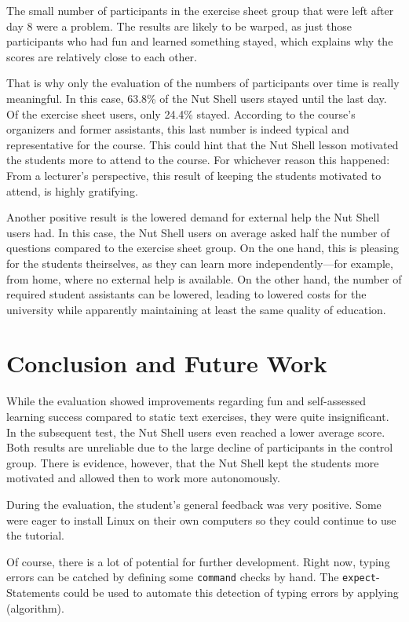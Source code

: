 \documentclass[paper=a4,twoside,abstract=on,cleardoublepage=empty,numbers=noenddot,toc=bib,12pt,appendixprefix=true]{scrreprt}
\begin{document}
The small number of participants in the exercise sheet group that were left after day 8 were a problem. The results are likely to be warped, as just those participants who had fun and learned something stayed, which explains why the scores are relatively close to each other.

That is why only the evaluation of the numbers of participants over time is really meaningful. In this case, 63.8\% of the Nut Shell users stayed until the last day. Of the exercise sheet users, only 24.4\% stayed. According to the course's organizers and former assistants, this last number is indeed typical and representative for the course. This could hint that the Nut Shell lesson motivated the students more to attend to the course. For whichever reason this happened: From a lecturer's perspective, this result of keeping the students motivated to attend, is highly gratifying.

Another positive result is the lowered demand for external help the Nut Shell users had. In this case, the Nut Shell users on average asked half the number of questions compared to the exercise sheet group. On the one hand, this is pleasing for the students theirselves, as they can learn more independently---for example, from home, where no external help is available. On the other hand, the number of required student assistants can be lowered, leading to lowered costs for the university while apparently maintaining at least the same quality of education.

\chapter{Conclusion and Future Work}

While the evaluation showed improvements regarding fun and self-assessed learning success compared to static text exercises, they were quite insignificant. In the subsequent test, the Nut Shell users even reached a lower average score. Both results are unreliable due to the large decline of participants in the control group. There is evidence, however, that the Nut Shell kept the students more motivated and allowed then to work more autonomously.

During the evaluation, the student's general feedback was very positive. Some were eager to install Linux on their own computers so they could continue to use the tutorial.

Of course, there is a lot of potential for further development. Right now, typing errors can be catched by defining some \texttt{command} checks by hand. The \texttt{expect}-Statements could be used to automate this detection of typing errors by applying (algorithm).
\end{document}

